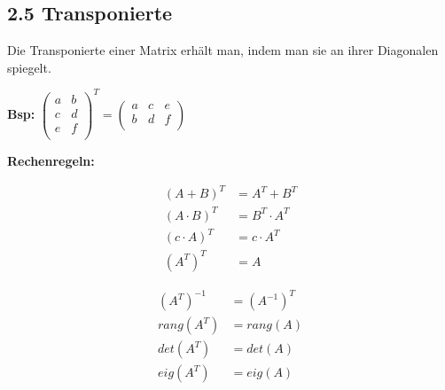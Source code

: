 \subsection{2.5 Transponierte}{
\vskip1pt
Die Transponierte einer Matrix erhält man, indem man sie an ihrer Diagonalen \glqq spiegelt\grqq.

\vspace{0.5mm}

\begin{center}

\textbf{Bsp:} 
$\begin{pmatrix}
a & b \\
c & d \\
e & f \\
\end{pmatrix}^T
=
\begin{pmatrix}
a & c & e \\
b & d & f \\
\end{pmatrix}$

\end{center}

\textbf{Rechenregeln:} \par
\vspace{-1.5mm}
\begin{minipage}[t]{0.49 \columnwidth}
\begin{align}
(A + B)^T &= A^T + B^T \nonumber \\
(A \cdot B)^T &= B^T \cdot A^T \nonumber \\
(c \cdot A)^T &= c \cdot A^T \nonumber \\
(A^T)^T &= A \nonumber
\end{align}
\end{minipage}
\begin{minipage}[t]{0.49 \columnwidth}
\begin{align}
(A^T)^{-1} &= (A^{-1})^T \nonumber \\
rang(A^T) &= rang(A) \nonumber \\
det(A^T) &= det(A) \nonumber \\
eig(A^T) &= eig(A) \nonumber
\end{align}
\end{minipage}


}
\WhiteSpace